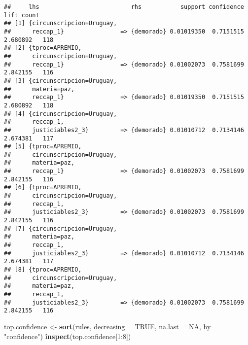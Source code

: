 \documentclass[runningheads,a4paper]{llncs}
\newenvironment{Shaded}{}{}
\newcommand{\KeywordTok}[1]{\textcolor[rgb]{0.00,0.44,0.13}{\textbf{{#1}}}}
\newcommand{\DataTypeTok}[1]{\textcolor[rgb]{0.56,0.13,0.00}{{#1}}}
\newcommand{\DecValTok}[1]{\textcolor[rgb]{0.25,0.63,0.44}{{#1}}}
\newcommand{\StringTok}[1]{\textcolor[rgb]{0.25,0.44,0.63}{{#1}}}
\newcommand{\OtherTok}[1]{\textcolor[rgb]{0.00,0.44,0.13}{{#1}}}
\newcommand{\NormalTok}[1]{{#1}}
\newcommand{\OperatorTok}[1]{\textcolor[rgb]{0.40,0.40,0.40}{{#1}}}
\begin{document}
\begin{verbatim}
##     lhs                          rhs           support confidence     lift count
## [1] {circunscripcion=Uruguay,                                                   
##      reccap_1}                => {demorado} 0.01019350  0.7151515 2.680892   118
## [2] {tproc=APREMIO,                                                             
##      circunscripcion=Uruguay,                                                   
##      reccap_1}                => {demorado} 0.01002073  0.7581699 2.842155   116
## [3] {circunscripcion=Uruguay,                                                   
##      materia=paz,                                                               
##      reccap_1}                => {demorado} 0.01019350  0.7151515 2.680892   118
## [4] {circunscripcion=Uruguay,                                                   
##      reccap_1,                                                                  
##      justiciables2_3}         => {demorado} 0.01010712  0.7134146 2.674381   117
## [5] {tproc=APREMIO,                                                             
##      circunscripcion=Uruguay,                                                   
##      materia=paz,                                                               
##      reccap_1}                => {demorado} 0.01002073  0.7581699 2.842155   116
## [6] {tproc=APREMIO,                                                             
##      circunscripcion=Uruguay,                                                   
##      reccap_1,                                                                  
##      justiciables2_3}         => {demorado} 0.01002073  0.7581699 2.842155   116
## [7] {circunscripcion=Uruguay,                                                   
##      materia=paz,                                                               
##      reccap_1,                                                                  
##      justiciables2_3}         => {demorado} 0.01010712  0.7134146 2.674381   117
## [8] {tproc=APREMIO,                                                             
##      circunscripcion=Uruguay,                                                   
##      materia=paz,                                                               
##      reccap_1,                                                                  
##      justiciables2_3}         => {demorado} 0.01002073  0.7581699 2.842155   116
\end{verbatim}

\begin{Shaded}
\begin{Highlighting}[]
\NormalTok{top.confidence <-}\StringTok{ }\KeywordTok{sort}\NormalTok{(rules, }\DataTypeTok{decreasing =} \OtherTok{TRUE}\NormalTok{, }\DataTypeTok{na.last =} \OtherTok{NA}\NormalTok{, }\DataTypeTok{by =} \StringTok{"confidence"}\NormalTok{)}
\KeywordTok{inspect}\NormalTok{(top.confidence[}\DecValTok{1}\OperatorTok{:}\DecValTok{8}\NormalTok{])}
\end{Highlighting}
\end{Shaded}
\end{document}
